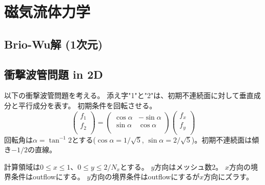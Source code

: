 \clearpage
\section{磁気流体力学}

\subsection{Brio-Wu解 (1次元)}

\subsection{衝撃波管問題 in 2D}

以下の衝撃波管問題を考える。
添え字"1"と"2"は、初期不連続面に対して垂直成分と平行成分を表す。
初期条件を回転させる。
\begin{equation}
\left(
\begin{array}{c}
f_1 \\
f_2 \\
\end{array}
\right)
=
\left(
\begin{array}{cc}
\cos\alpha & - \sin\alpha \\
\sin\alpha & \cos\alpha \\
\end{array}
\right)
\left(
\begin{array}{c}
f_x \\
f_y \\
\end{array}
\right)
\end{equation}
回転角は$\alpha=\tan^{-1}2$とする($\cos\alpha=1/\sqrt{5}$,\;\;
$\sin\alpha=2/\sqrt{5}$)。初期不連続面は傾き$-1/2$の直線。

計算領域は$0\le x \le 1$、$0\le y \le 2/N_x$とする。
$y$方向はメッシュ数$2$。
$x$方向の境界条件はoutflowにする。
$y$方向の境界条件はoutflowにするが$x$方向にズラす。



